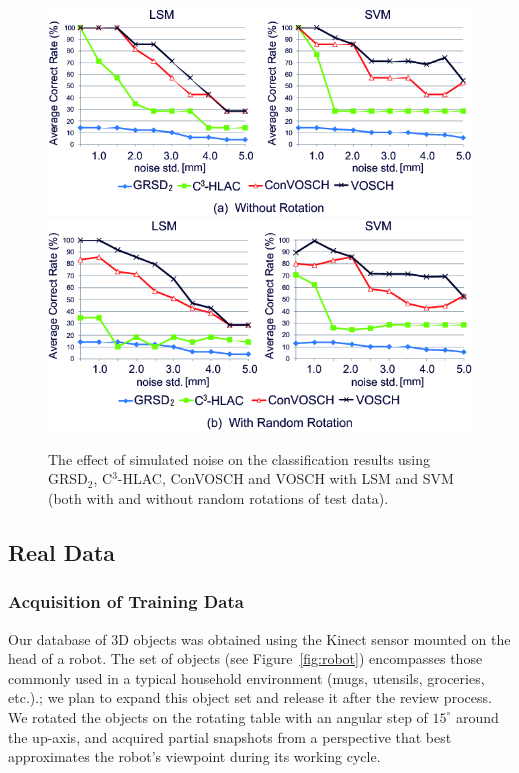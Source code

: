 \documentclass[a4paper, 10 pt, conference]{sty/ieeeconf}
\begin{document}
\begin{figure}[tb!]
  \centering
  \includegraphics[width=.49\textwidth]{figures/synthetic_experiment/synthetic_experimental_result_1.png}
  \includegraphics[width=.49\textwidth]{figures/synthetic_experiment/synthetic_experimental_result_2.png}
  \caption{The effect of simulated noise on the classification results using GRSD$_2$, C$^3$-HLAC, ConVOSCH and VOSCH with LSM and SVM
    (both with and without random rotations of test data).}
  \label{fig:synthetic}
\end{figure}


\subsection{Real Data}
\label{sec:real_data}
\subsubsection{Acquisition of Training Data}
Our database of 3D objects was obtained using the Kinect sensor mounted on the head of a robot.
The set of objects (see Figure~\ref{fig:robot}) encompasses those commonly used
in a typical household environment (mugs, utensils, groceries, etc.).; 
we plan to expand this object set and release it after the review process.
We rotated the objects on the rotating table with
an angular step of $15^\circ$ around the up-axis, and acquired partial
snapshots from a perspective that best approximates the robot's viewpoint during its working cycle.  

\end{document}
